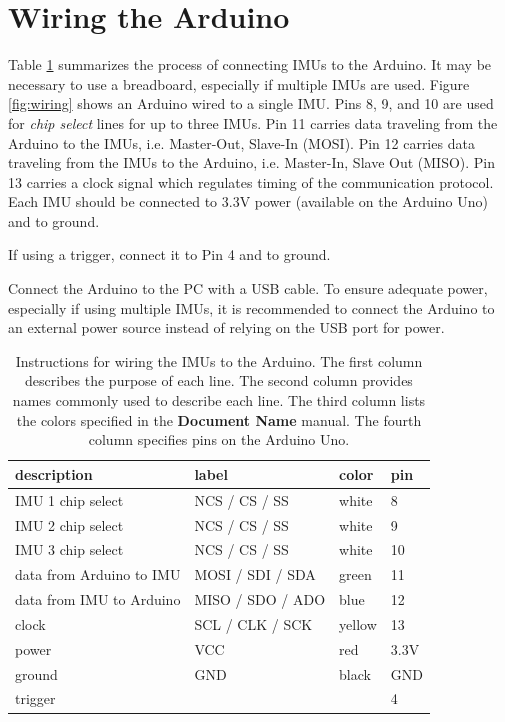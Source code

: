 \documentclass[11pt,letterpaper,article,oneside]{memoir}
\begin{document}
\section{Wiring the Arduino}
\label{sec:wiring}
Table \ref{tab:wiring} summarizes the process of connecting IMUs to the Arduino.
It may be necessary to use a breadboard, especially if multiple IMUs are used.
Figure \ref{fig:wiring} shows an Arduino wired to a single IMU.  Pins 8, 9, and
10 are used for \emph{chip select} lines for up to three IMUs. Pin 11 carries
data traveling from the Arduino to the IMUs, i.e. Master-Out, Slave-In (MOSI).
Pin 12 carries data traveling from the IMUs to the Arduino, i.e. Master-In,
Slave Out (MISO). Pin 13 carries a clock signal which regulates timing of the
communication protocol.  Each IMU should be connected to 3.3V power (available
on the Arduino Uno) and to ground.

If using a trigger, connect it to Pin 4 and to ground.

Connect the Arduino to the PC with a USB cable.  To ensure adequate power,
especially if using multiple IMUs, it is recommended to connect the Arduino to
an external power source instead of relying on the USB port for power.

\begin{table}
\centering
\begin{tabular}{@{}*4l@{}}
\toprule
description & label & color & pin \\
\midrule 
IMU 1 chip select & NCS / CS / SS & white & 8 \\
IMU 2 chip select & NCS / CS / SS & white & 9 \\
IMU 3 chip select & NCS / CS / SS & white & 10 \\
data from Arduino to IMU & MOSI / SDI / SDA & green & 11 \\
data from IMU to Arduino & MISO / SDO / ADO & blue & 12 \\
clock & SCL / CLK / SCK & yellow & 13 \\
power & VCC & red & 3.3V \\
ground & GND & black & GND \\
trigger &  &  & 4 \\
\bottomrule
\end{tabular}

\caption{Instructions for wiring the IMUs to the Arduino. The first column
describes the purpose of each line. The second column provides names commonly
used to describe each line. The third column lists the colors specified in the
\textbf{Document Name} manual. The fourth column specifies pins on the Arduino
Uno.}

\label{tab:wiring}
\end{table}
\end{document}
